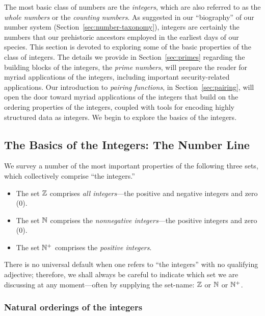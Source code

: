 The most basic class of numbers are the {\it integers},
which are also referred to as the {\it whole numbers}
or the {\em counting numbers}.
%
As suggested in our ``biography'' of our number system
(Section~\ref{sec:number-taxonomy}), integers are certainly the
numbers that our prehistoric ancestors employed in the earliest days
of our species.  This section is devoted to exploring some of the
basic properties of the class of integers.  The details we provide in
Section~\ref{sec:primes} regarding the building blocks of the
integers, the {\it prime numbers}, 
will prepare the reader for myriad applications of the integers,
including important security-related applications.  Our introduction
to {\it pairing functions},
in Section~\ref{sec:pairing}, will open the door toward myriad 
applications of the integers that build on the ordering properties of
the integers, coupled with tools for encoding highly structured data
as integers.  We begin to explore the basics of the integers.

\subsection{The Basics of the Integers: The Number Line}
\label{sec:integer-number-line}

We survey a number of the most important properties of the following
three sets, which collectively comprise ``the integers.''
\begin{itemize}
\item
The set $\mathbb{Z}$
comprises {\em all integers}---the positive and negative integers and
zero ($0$).
\item
The set $\mathbb{N}$
comprises the {\em nonnegative integers}---the positive integers and
zero ($0$).
\item
The set $\mathbb{N}^+$
comprises the {\em positive integers}.
\end{itemize}
There is no universal default when one refers to ``the integers'' with
no qualifying adjective; therefore, we shall always be careful to
indicate which set we are discussing at any moment---often by
supplying the set-name: $\mathbb{Z}$ or $\mathbb{N}$ or $\mathbb{N}^+$.

\subsubsection{Natural orderings of the integers}
\label{sec:natural-orderings}

